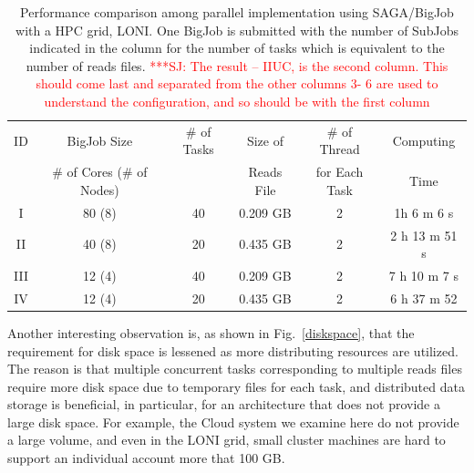 \documentclass[12pt]{article}
\newcommand{\jhanote}[1]{ {\textcolor{red}     {***SJ: #1}}}
\newcommand{\jhanote}[1]{}
\begin{document}
 \begin{table}
 \begin{tabular}{|ccccc|c |} 
 \hline 
ID & BigJob Size  &  \# of Tasks & Size of  & \# of Thread  &   Computing  \\
   & \# of Cores (\# of Nodes) &  & Reads File & for Each Task &  Time\\\hline
I   & 80  (8) &  40 & 0.209 GB & 2 & 1h 6 m 6 s \\
II  & 40 (8)  &  20 & 0.435 GB & 2 & 2 h 13 m 51 s\\
III & 12 (4)  & 40  & 0.209 GB & 2 & 7 h 10 m 7 s \\
IV & 12 (4)  & 20 & 0.435 GB & 2 &  6 h 37 m 52  \\
\hline
\end{tabular}
\caption{Performance comparison among parallel implementation using SAGA/BigJob with a HPC grid, LONI. One BigJob is submitted with the number of SubJobs indicated in the column for the number of tasks which is equivalent to the number of reads files.\jhanote{The result -- IIUC, is the second column. This should come last and separated from the other columns 3- 6 are used to understand the configuration, and so should be with the first column}}
  \label{table:bigjob-loni} 
\end{table}
 
Another interesting observation is, as shown in Fig.~\ref{diskspace}, that the requirement for disk space is lessened as more distributing resources are utilized. The reason is that multiple concurrent tasks corresponding to multiple reads files require more disk space due to temporary files for each task, and distributed data storage is beneficial, in particular, for an architecture that does not provide a large disk space.  For example, the Cloud system we examine here do not provide a large volume, and even in the LONI grid, small cluster machines are hard to support an individual account more that 100 GB.    
\end{document}
